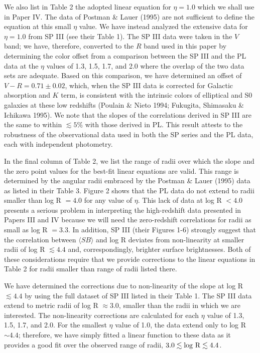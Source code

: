 \documentclass[preprint]{aastex}
\begin{document}
We also list in Table 2 the adopted linear equation for $\eta = 1.0$
which we shall use in Paper IV. The data of Postman \& Lauer (1995)
are not sufficient to define the equation at this small $\eta$ value.
We have instead analyzed the extensive data for $\eta = 1.0$ from SP
III (see their Table 1).  The SP III data were taken in the $V$ band;
we have, therefore, converted to the $R$ band used in this paper by
determining the color offset from a comparison between the SP III and
the PL data at the $\eta$ values of 1.3, 1.5, 1.7, and 2.0 where the
overlap of the two data sets are adequate. Based on this comparison,
we have determined an offset of $V-R = 0.71 \pm 0.02$, which, when the
SP III data is corrected for Galactic absorption and $K$ term, is
consistent with the intrinsic colors of elliptical and S0 galaxies at
these low redshifts (Poulain \& Nieto 1994; Fukugita, Shimasaku \&
Ichikawa 1995). We note that the slopes of the correlations derived in
SP III are the same to within $\lesssim 5\%$ with those derived in
PL. This result attests to the robustness of the observational data
used in both the SP series and the PL data, each with independent
photometry.

In the final column of Table 2, we list the range of radii over which
the slope and the zero point values for the best-fit linear equations
are valid. This range is determined by the angular radii embraced by
the Postman \& Lauer (1995) data as listed in their Table 3. Figure 2
shows that the PL data do not extend to radii smaller than log R $=
4.0$ for any value of $\eta$. This lack of data at log R $< 4.0$
presents a serious problem in interpreting the high-redshift data
presented in Papers III and IV because we will need the zero-redshift
correlations for radii as small as log R $= 3.3$. In addition, SP III
(their Figures 1-6) strongly suggest that the correlation between
$\langle SB \rangle$ and log R deviates from non-linearity at smaller
radii of log R $\lesssim 4.4$ and, correspondingly, brighter surface
brightnesses.  Both of these considerations require that we provide
corrections to the linear equations in Table 2 for radii smaller than
range of radii listed there.

We have determined the corrections due to non-linearity of the slope
at log R $\lesssim 4.4$ by using the full dataset of SP III listed in
their Table 1.  The SP III data extend to metric radii of log R
$\approx 3.0$, smaller than the radii in which we are interested. The
non-linearity corrections are calculated for each $\eta$ value of 1.3,
1.5, 1.7, and 2.0. For the smallest $\eta$ value of 1.0, the data
extend only to log R $\sim 4.4$; therefore, we have simply fitted a
linear function to these data as it provides a good fit over the
observed range of radii, $3.0 \lesssim {\rm log~R} \lesssim 4.4$.
\end{document}
